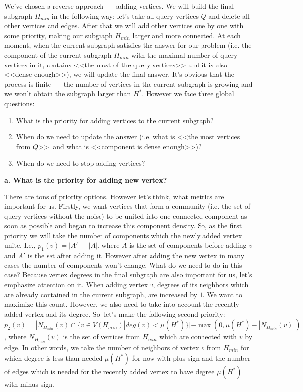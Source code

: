 We've chosen a reverse approach~--- adding vertices. We will build the final subgraph $H_{min}$ in the following way: let's take all query vertices $Q$ and delete all other vertices and edges. After that we will add other vertices one by one with some priority, making our subgraph $H_{min}$ larger and more connected. At each moment, when the current subgraph satisfies the answer for our problem (i.e. the component of the current subgraph $H_{min}$ with the maximal number of query vertices in it, contains <<the most of the query vertices>> and it is also <<dense enough>>), we will update the final answer. It's obvious that the process is finite~--- the number of vertices in the current subgraph is growing and we won't obtain the subgraph larger than $H^*$. However we face three global questions:

\begin{enumerate}
  \item What is the priority for adding vertices to the current subgraph?
  \item When do we need to update the answer (i.e. what is <<the most vertices from $Q$>>, and what is <<component is dense enough>>)?
  \item When do we need to stop adding vertices?
\end{enumerate}

\textbf{a. What is the priority for adding new vertex?}

There are tons of priority options. However let's think, what metrics are important for us. Firstly, we want vertices that form a community (i.e. the set of query vertices without the noise) to be united into one connected component as soon as possible and began to increase this component density. So, as the first priority we will take the number of components which the newly added vertex unite. I.e., $p_1(v) = |A'| - |A|$, where $A$ is the set of components before adding $v$ and $A'$ is the set after adding it. However after adding the new vertex in many cases the number of components won't change. What do we need to do in this case? Because vertex degrees in the final subgraph are also important for us, let's emphasize attention on it. When adding vertex $v$, degrees of its neighbors which are already contained in the current subgraph, are increased by $1$. We want to maximize this count. However, we also need to take into account the recently added vertex and its degree. So, let's make the following second priority: $p_2(v) = |N_{H_{min}}(v) \cap \{v \in V(H_{min}) | deg(v) < \mu(H^*)\}| - \max(0, \mu(H^*) - |N_{H_{min}}(v)|)$, where $N_{H_{min}}(v)$ is the set of vertices from $H_{min}$ which are connected with $v$ by edge. In other words, we take the number of neighbors of vertex $v$ from $H_{min}$ for which degree is less than needed $\mu(H^*)$ for now with plus sign and the number of edges which is needed for the recently added vertex to have degree $\mu(H^*)$ with minus sign.

